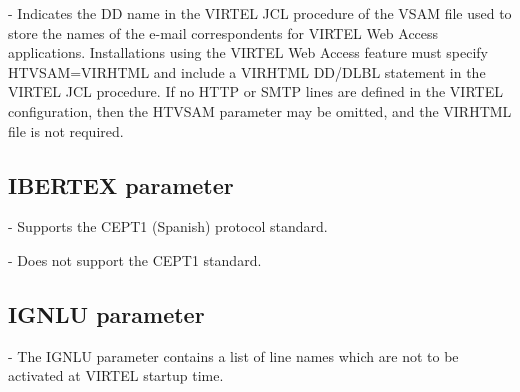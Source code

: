 \documentclass[letterpaper,10pt,english]{sphinxmanual}
\begin{document}
 - Indicates the DD name in the VIRTEL JCL procedure of the VSAM file used to store the names of the e-mail correspondents for VIRTEL Web Access applications. Installations using the VIRTEL Web Access feature must specify HTVSAM=VIRHTML and include a VIRHTML DD/DLBL statement in the VIRTEL JCL procedure. If no HTTP or SMTP lines are defined in the VIRTEL configuration, then the HTVSAM parameter may be omitted, and the VIRHTML file is not required.


\subsection{IBERTEX parameter}
\label{\detokenize{Installation_Guide:index-81}}\label{\detokenize{Installation_Guide:ibertex-parameter}}
\begin{sphinxVerbatim}[commandchars=\\\{\}]
                      
\end{sphinxVerbatim}

 - Supports the CEPT1 (Spanish) protocol standard.

 - Does not support the CEPT1 standard.


\subsection{IGNLU parameter}
\label{\detokenize{Installation_Guide:index-82}}\label{\detokenize{Installation_Guide:ignlu-parameter}}
\begin{sphinxVerbatim}[commandchars=\\\{\}]
            
\end{sphinxVerbatim}

 - The IGNLU parameter contains a list of line names which are not to be activated at VIRTEL startup time.

\end{document}
